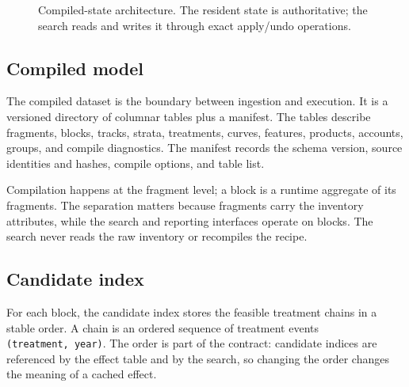 \documentclass[preprint,11pt]{elsarticle}
\begin{document}
\begin{figure}[t]
\centering
{}
\caption{Compiled-state architecture. The resident state is authoritative; the search reads and writes it through exact apply/undo operations.}
\label{fig:architecture}
\end{figure}

\subsection{Compiled model}\label{compiled-model}

The compiled dataset is the boundary between ingestion and execution. It is a versioned directory of columnar tables plus a manifest. The tables describe fragments, blocks, tracks, strata, treatments, curves, features, products, accounts, groups, and compile diagnostics. The manifest records the schema version, source identities and hashes, compile options, and table list.

Compilation happens at the fragment level; a block is a runtime aggregate of its fragments. The separation matters because fragments carry the inventory attributes, while the search and reporting interfaces operate on blocks. The search never reads the raw inventory or recompiles the recipe.

\subsection{Candidate index}\label{candidate-index}

For each block, the candidate index stores the feasible treatment chains in a stable order. A chain is an ordered sequence of treatment events \texttt{(treatment,\ year)}. The order is part of the contract: candidate indices are referenced by the effect table and by the search, so changing the order changes the meaning of a cached effect.
\end{document}

